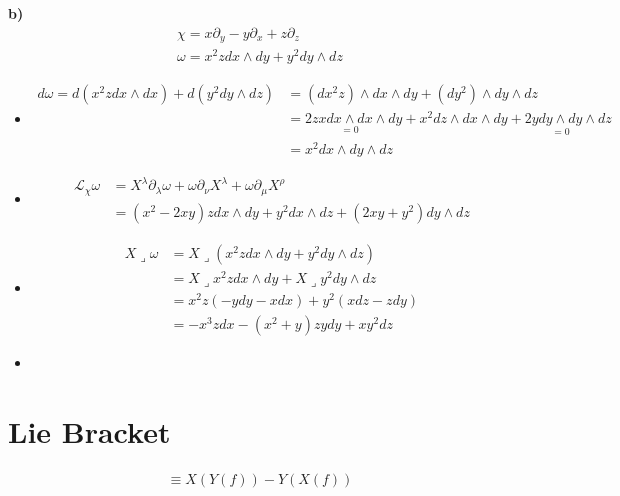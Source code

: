 \documentclass{article}
\begin{document}
\textbf{b) }
\begin{gather*}
  \chi = x \partial_y - y \partial_x + z \partial_z \\
  \omega = x^2 z dx \wedge dy + y^2 dy\wedge dz
\end{gather*}
\begin{itemize}
  \item 
    \begin{align*}
      d\omega = d(x^2z dx \wedge dx) + d(y ^2 dy \wedge dz) &= (dx ^2 z) \wedge dx \wedge dy + (dy^2) \wedge dy \wedge dz \\
                &= 2zx \underset{=0 }{dx\wedge dx }\wedge dy + x^2 dz\wedge dx \wedge dy + 2y \underset{=0 }{dy\wedge dy }\wedge dz \\
                &= x^2 dx\wedge dy \wedge dz 
    \end{align*}
  \item 
    \begin{align*}
      \mathcal L_\chi \omega &= X^\lambda \partial_\lambda \omega + \omega \partial_\nu X^\lambda + \omega \partial_\mu X^\rho\\
                             &= (x^2 - 2xy)zdx\wedge dy + y^2 dx \wedge dz + (2xy + y^2) dy\wedge dz 
    \end{align*}
  \item 
    \begin{align*}
      X\lrcorner \omega &= X \lrcorner (x^2 z dx \wedge dy + y^2 dy\wedge dz) \\
           &= X \lrcorner x^2 z dx \wedge dy + X\lrcorner y^2 dy \wedge dz \\
           &= x^2z(-ydy-xdx)+y^2(xdz-zdy)\\
           &= -x^3zdx - (x^2 + y )zydy + xy^2 dz 
    \end{align*}

  \item 
\end{itemize}




\section{Lie Bracket}
\begin{gather*}
  [X,Y] \equiv X(Y(f)) - Y(X(f)) 
\end{gather*}
\end{document}
